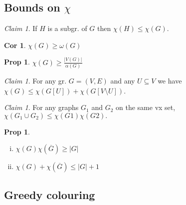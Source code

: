 \documentclass[11pt, fleqn, a4paper, landscape]{article}
\theoremstyle{plain} %
\newtheorem{pro}[thm]{Prop}
\newtheorem{cor}[thm]{Cor}
\theoremstyle{remark} %
\newtheorem{claim}[thm]{Claim}
\theoremstyle{definition} %
\newtheorem{defi}[thm]{Def}
\begin{document}
\begin{multicols}{5}
\addtocounter{subsection}{1}
\addtocounter{thm}{1}\addtocounter{thm}{1}
\subsection{Bounds on $\chi$}
\begin{claim}
If $H$ is a subgr. of $G$ then $\chi(H) \le \chi(G)$.
\end{claim}

\begin{cor}
$\chi(G) \ge \omega(G)$
\end{cor}
\addtocounter{thm}{1}
\begin{pro}
$\chi(G) \ge\frac{|V (G)|}{\alpha(G)}$
\end{pro}

\begin{claim}
For any gr. $G = (V,E)$ and any $U \subseteq V$ we have $\chi(G) \le \chi(G[U]) + \chi(G[V \setminus U])$.
\end{claim}

\begin{claim}
For any graphs $G_1$ and $G_2$ on the same vx set, $\chi(G_1 \cup G_2) \le \chi(G1)\chi(G2).$
\end{claim}


\begin{pro}
\begin{enumerate}[(i)]
\item $\chi(G)\chi(\overline{G})\ge |G|$
\item $\chi(G)+\chi(\overline{G})\le |G|+1$
\end{enumerate}
\end{pro}

\subsection{Greedy colouring}

\addtocounter{thm}{3}


\end{multicols}
\end{document}
